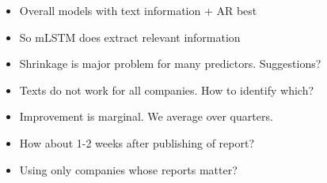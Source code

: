 \documentclass{article}
\begin{document}




\begin{frame}
  \begin{itemize}
  \item Overall models with text information + AR best
  \item So mLSTM does extract relevant information
  \item Shrinkage is major problem for many predictors. Suggestions?
  \item Texts do not work for all companies. How to identify which?
  \item Improvement is marginal. We average over quarters.
  \item How about 1-2 weeks after publishing of report?
  \item Using only companies whose reports matter?
  \end{itemize}
\end{frame}

\begin{frame}[allowframebreaks]
  \printbibliography
\end{frame}
\end{document}
